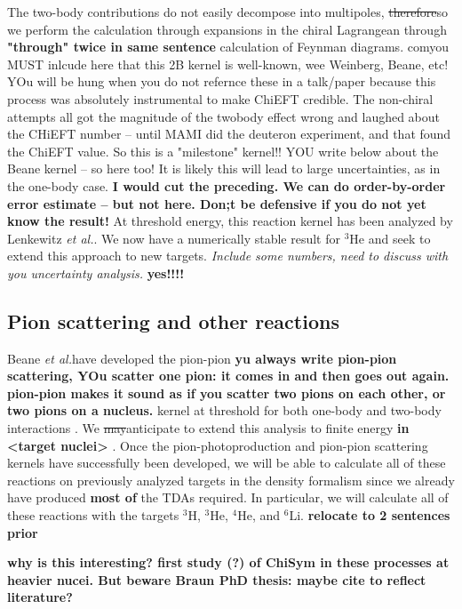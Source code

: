 \documentclass[a4paper,11pt]{article}
\newcommand{\etal}{\textit{et al.}}
\newcommand{\LiS}{{}^{6} \mathrm{Li} }
\newcommand{\HeF}{{}^{4} \mathrm{He}}
\newcommand{\HeT}{{}^{3} \mathrm{He}}
\newcommand{\HThree}{{}^{3} \mathrm{H}}
\newcommand{\ques}[1]{\color{red}\textit{ #1 }\color{black}}
\newcommand{\com}[1]{\color{blue}\small\textbf{ #1 }\color{black}\normalsize}
\newcommand{\replace}[2]{\sout{\protect#1}\color{blue}#2\color{black}}
\begin{document}
The two-body contributions do not easily decompose into multipoles, \replace{therefore}{so} we perform the calculation through expansions
in the chiral Lagrangean through \com{"through" twice in same sentence} calculation of Feynman diagrams. com{you MUST inlcude here that this 2B kernel is well-known, wee Weinberg, Beane, etc! YOu will be hung when you do not refernce these in a talk/paper because this process was absolutely instrumental to make ChiEFT credible. The non-chiral attempts all got the magnitude of the twobody effect wrong and laughed about the CHiEFT number -- until MAMI did the deuteron experiment, and that found the ChiEFT value. So this is a "milestone" kernel!! YOU write below about the Beane kernel -- so here too!}
It is likely this will lead to large uncertainties, as in the one-body case. \com{I would cut the preceding. We can do order-by-order error estimate -- but not here. Don;t be defensive if you do not yet know the result!}
At threshold energy, this reaction kernel has been analyzed by
Lenkewitz \etal \cite{L2011, L2013}.
We now have a numerically stable result for $\HeT$ and seek to extend
this approach to new targets.
\ques{Include some numbers, need to discuss with you uncertainty analysis.} \com{yes!!!!}
\subsection{Pion scattering and other reactions}
Beane \etal have developed the pion-pion \com{yu always write pion-pion scattering, YOu scatter one pion: it comes in and then goes out again. pion-pion makes it sound as if you scatter two pions on each other, or two pions on a nucleus.} kernel at threshold for both
one-body and two-body interactions \cite{Beane2003}.
We \replace{may}{anticipate to} extend this analysis to finite energy \com{in <target nuclei>}.
Once the pion-photoproduction and pion-pion scattering kernels have
successfully been developed, we will be able to calculate all of
these reactions on previously analyzed targets in the density
formalism since we already have produced \com{most of} the TDAs required.
In particular, we will calculate all of these reactions with the
targets $\HThree$, $\HeT$, $\HeF$, and $\LiS$. \com{relocate to 2 sentences prior}

\com{why is this interesting? first study (?) of ChiSym in these processes at heavier nucei. But beware Braun PhD thesis: maybe cite to reflect literature?}

\end{document}
